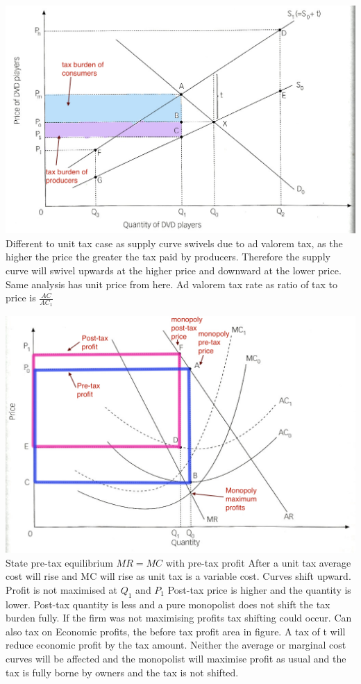 \documentclass[12pt]{examnotes}
\begin{document}
\includegraphics[scale=0.3]{./imgs/102.jpg}
\ra Different to unit tax case as supply curve swivels due to ad valorem tax, as the higher the price the greater the tax paid by producers.
\ra Therefore the supply curve will swivel upwards at the higher price and downward at the lower price.
\ra Same analysis has unit price from here.
\ra Ad valorem tax rate as ratio of tax to price is $\frac{AC}{AC_1}$ 

\includegraphics[scale=0.3]{./imgs/103.jpg}
\ra State pre-tax equilibrium $MR=MC$ with pre-tax profit
\ra After a unit tax average cost will rise and MC will rise as unit tax is a variable cost. Curves shift upward.
\ra Profit is not maximised at $Q_1$ and $P_1$
\ra Post-tax price is higher and the quantity is lower.
\ra Post-tax quantity is less and a pure monopolist does not shift the tax burden fully. If the firm was not maximising profits tax shifting could occur.
\ra Can also tax on Economic profits, the before tax profit area in figure. A tax of t will reduce economic profit by the tax amount. Neither the average or marginal cost curves will be affected and the monopolist will maximise profit as usual and the tax is fully borne by owners and the tax is not shifted.
\end{document}
